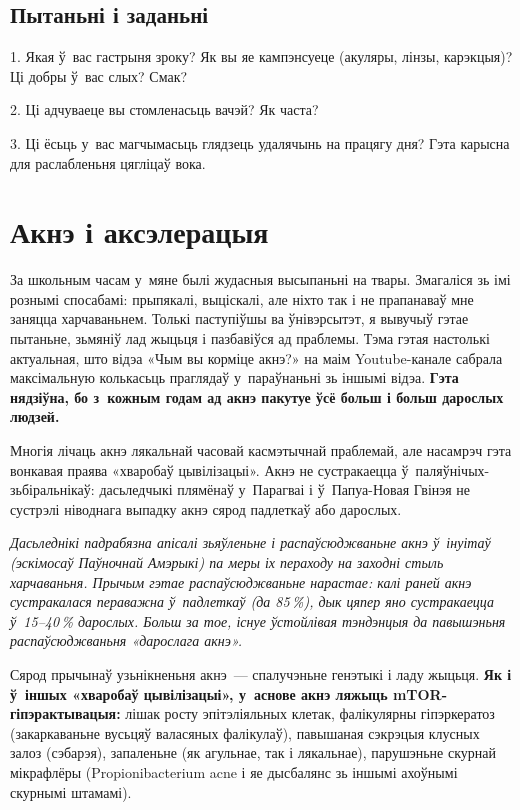 \subsection*{Пытаньні і заданьні}

1. Якая ў~вас гастрыня зроку? Як вы яе кампэнсуеце (акуляры, лінзы, карэкцыя)? Ці добры ў~вас слых? Смак?

2. Ці адчуваеце вы стомленасьць вачэй? Як часта?

3. Ці ёсьць у~вас магчымасьць глядзець удалячынь на працягу дня? Гэта карысна для раслабленьня цягліцаў вока.


\section{Акнэ і аксэлерацыя}

За школьным часам у~мяне былі жудасныя высыпаньні на твары. Змагаліся зь імі рознымі спосабамі: прыпякалі, выціскалі, але ніхто так і не прапанаваў мне заняцца харчаваньнем. Толькі паступіўшы ва ўнівэрсытэт, я вывучыў гэтае пытаньне, зьмяніў лад жыцьця і пазбавіўся ад праблемы. Тэма гэтая настолькі актуальная, што відэа «Чым вы корміце акнэ?» на маім Youtube-канале сабрала максімальную колькасьць праглядаў у~параўнаньні зь іншымі відэа. \textbf{Гэта нядзіўна, бо з~кожным годам ад акнэ пакутуе ўсё больш і больш дарослых людзей.}

Многія лічаць акнэ лякальнай часовай касмэтычнай праблемай, але насамрэч гэта вонкавая праява «хваробаў цывілізацыі». Акнэ не сустракаецца ў~паляўнічых-зьбіральнікаў: дасьледчыкі плямёнаў у~Парагваі і ў~Папуа-Новая Гвінэя не сустрэлі ніводнага выпадку акнэ сярод падлеткаў або дарослых.

\emph{Дасьледнікі падрабязна апісалі зьяўленьне і распаўсюджваньне акнэ ў~інуітаў (эскімосаў Паўночнай Амэрыкі) па меры іх пераходу на заходні стыль харчаваньня. Прычым гэтае распаўсюджваньне нарастае: калі раней акнэ сустракалася пераважна ў~падлеткаў (да 85\,\%), дык цяпер яно сустракаецца ў~15--40\,\% дарослых. Больш за тое, існуе ўстойлівая тэндэнцыя да павышэньня распаўсюджваньня «дарослага акнэ».}

Сярод прычынаў узьнікненьня акнэ~--- спалучэньне генэтыкі і ладу жыцьця. \textbf{Як і ў~іншых «хваробаў цывілізацыі», у~аснове акнэ ляжыць mTOR-гіпэрактывацыя:} лішак росту эпітэліяльных клетак, фалікулярны гіпэркератоз (закаркаваньне вусьцяў валасяных фалікулаў), павышаная сэкрэцыя клусных залоз (сэбарэя), запаленьне (як агульнае, так і лякальнае), парушэньне скурнай мікрафлёры (Propionibacterium acne і яе дысбалянс зь іншымі ахоўнымі скурнымі штамамі).

